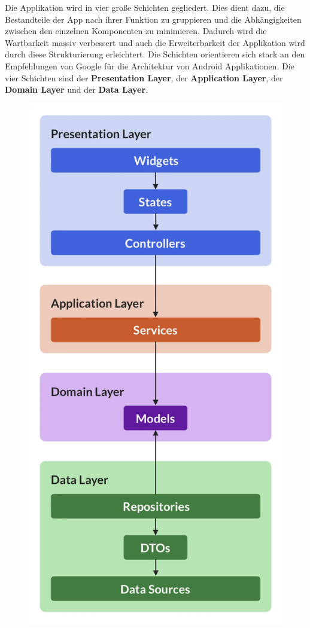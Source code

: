 \documentclass[parskip=full]{scrartcl}
\begin{document}
Die Applikation wird in vier große Schichten gegliedert. Dies dient dazu, die Bestandteile der App nach ihrer Funktion zu gruppieren und die Abhängigkeiten zwischen den einzelnen Komponenten zu minimieren. Dadurch wird die Wartbarkeit massiv verbessert und auch die Erweiterbarkeit der Applikation wird durch diese Strukturierung erleichtert. Die Schichten orientieren sich stark an den Empfehlungen von Google für die Architektur von Android Applikationen. Die vier Schichten sind der \textbf{Presentation Layer}, der \textbf{Application Layer}, der \textbf{Domain Layer} und der \textbf{Data Layer}. 
\begin{figure}[htp]
    \centering
    \includegraphics[height = 0.4\textheight]{images/architecture/architecture.png}

\end{figure}
\end{document}
